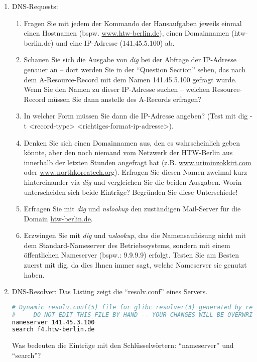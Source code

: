 \documentclass[paper=a4,fontsize=11pt]{scrartcl}%
\numberwithin{equation}{section}
\begin{document}
\begin{enumerate}
	\item DNS-Requests:
\begin{enumerate}
		\item Fragen Sie mit jedem der Kommando der Hausaufgaben jeweils einmal einen Hostnamen (bspw. \url{www.htw-berlin.de}), einen Domainnamen (htw-berlin.de) und eine IP-Adresse (141.45.5.100) ab.
		\item Schauen Sie sich die Ausgabe von \emph{dig} bei der Abfrage der IP-Adresse genauer an -- dort werden Sie in der \enquote{Question Section} sehen, das nach dem A-Resource-Record mit dem Namen 141.45.5.100 gefragt wurde. Wenn Sie den Namen zu dieser IP-Adresse suchen -- welchen Resource-Record müssen Sie dann anstelle des A-Records erfragen? 
		\item In welcher Form müssen Sie dann die IP-Adresse angeben? (Test mit dig -t <record-type> <richtiges-format-ip-adresse>).
		\item Denken Sie sich einen Domainnamen aus, den es wahrscheinlich geben könnte, aber den noch niemand vom Netzwerk der HTW-Berlin aus innerhalb der letzten Stunden angefragt hat (z.B. \url{www.uriminzokkiri.com} oder \url{www.northkoreatech.org}). Erfragen Sie diesen Namen zweimal kurz hintereinander via \emph{dig} und vergleichen Sie die beiden Ausgaben. Worin unterscheiden sich beide Einträge? Begründen Sie diese Unterschiede!
		\item Erfragen Sie mit \emph{dig} und \emph{nslookup} den zuständigen Mail-Server für die Domain \url{htw-berlin.de}.
		\item Erzwingen Sie mit \emph{dig} und \emph{nslookup}, das die Namensauflösung nicht mit dem Standard-Nameserver des Betriebssystems, sondern mit einem öffentlichen Nameserver (bspw.: 9.9.9.9) erfolgt. Testen Sie am Besten zuerst mit dig, da dies Ihnen immer sagt, welche Nameserver sie genutzt haben.
	\end{enumerate}
	\item DNS-Resolver: Das Listing zeigt die \enquote{resolv.conf} eines Servers. 
	\begin{lstlisting}[style=Bash, language=Bash]
# Dynamic resolv.conf(5) file for glibc resolver(3) generated by resolvconf(8)
#     DO NOT EDIT THIS FILE BY HAND -- YOUR CHANGES WILL BE OVERWRITTEN
nameserver 141.45.3.100
search f4.htw-berlin.de
\end{lstlisting} \label{dns}
Was bedeuten die Einträge mit den Schlüsselwörtern: \enquote{nameserver} und \enquote{search}?
\end{enumerate}
\end{document}
